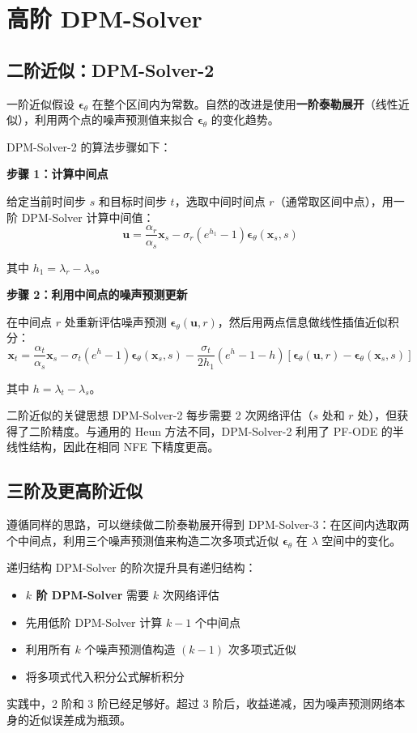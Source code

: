 \section{高阶 DPM-Solver}

\subsection{二阶近似：DPM-Solver-2}

一阶近似假设 $\boldsymbol{\epsilon}_\theta$ 在整个区间内为常数。自然的改进是使用\textbf{一阶泰勒展开}（线性近似），利用两个点的噪声预测值来拟合 $\boldsymbol{\epsilon}_\theta$ 的变化趋势。

DPM-Solver-2 的算法步骤如下：

\textbf{步骤 1：计算中间点}

给定当前时间步 $s$ 和目标时间步 $t$，选取中间时间点 $r$（通常取区间中点），用一阶 DPM-Solver 计算中间值：
$$\mathbf{u} = \frac{\alpha_r}{\alpha_s} \mathbf{x}_s - \sigma_r (e^{h_1} - 1) \boldsymbol{\epsilon}_\theta(\mathbf{x}_s, s)$$

其中 $h_1 = \lambda_r - \lambda_s$。

\textbf{步骤 2：利用中间点的噪声预测更新}

在中间点 $r$ 处重新评估噪声预测 $\boldsymbol{\epsilon}_\theta(\mathbf{u}, r)$，然后用两点信息做线性插值近似积分：
$$\mathbf{x}_t = \frac{\alpha_t}{\alpha_s} \mathbf{x}_s - \sigma_t (e^{h} - 1) \boldsymbol{\epsilon}_\theta(\mathbf{x}_s, s) - \frac{\sigma_t}{2h_1}(e^{h} - 1 - h)\left[\boldsymbol{\epsilon}_\theta(\mathbf{u}, r) - \boldsymbol{\epsilon}_\theta(\mathbf{x}_s, s)\right]$$

其中 $h = \lambda_t - \lambda_s$。

\begin{importantbox}{二阶近似的关键思想}
DPM-Solver-2 每步需要 2 次网络评估（$s$ 处和 $r$ 处），但获得了二阶精度。与通用的 Heun 方法不同，DPM-Solver-2 利用了 PF-ODE 的半线性结构，因此在相同 NFE 下精度更高。
\end{importantbox}

\subsection{三阶及更高阶近似}

遵循同样的思路，可以继续做二阶泰勒展开得到 DPM-Solver-3：在区间内选取两个中间点，利用三个噪声预测值来构造二次多项式近似 $\boldsymbol{\epsilon}_\theta$ 在 $\lambda$ 空间中的变化。

\begin{knowledgebox}{递归结构}
DPM-Solver 的阶次提升具有递归结构：
\begin{itemize}
    \item \textbf{$k$ 阶 DPM-Solver} 需要 $k$ 次网络评估
    \item 先用低阶 DPM-Solver 计算 $k-1$ 个中间点
    \item 利用所有 $k$ 个噪声预测值构造 $(k-1)$ 次多项式近似
    \item 将多项式代入积分公式解析积分
\end{itemize}
实践中，2 阶和 3 阶已经足够好。超过 3 阶后，收益递减，因为噪声预测网络本身的近似误差成为瓶颈。
\end{knowledgebox}

